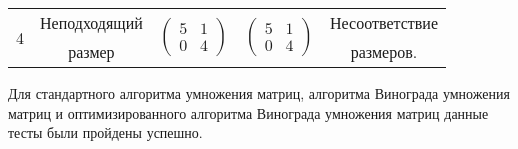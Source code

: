 \begin{table}[H]
\begin{tabular}{|c|c|c|c|c|}
		\\ \hline
		\multirow{2}{*}{4}  &Неподходящий
		& \multirow{2}{*}{$\begin{pmatrix}5 & 1\\0 & 4\end{pmatrix}$}
		& \multirow{2}{*}{$\begin{pmatrix}5 & 1\\0 & 4\end{pmatrix}$}
		& Несоответствие\\
		&размер & & &размеров.
		\\ \hline
	\end{tabular}
\end{table}
Для стандартного алгоритма умножения матриц, алгоритма Винограда умножения матриц и оптимизированного алгоритма Винограда умножения матриц данные тесты были пройдены успешно.